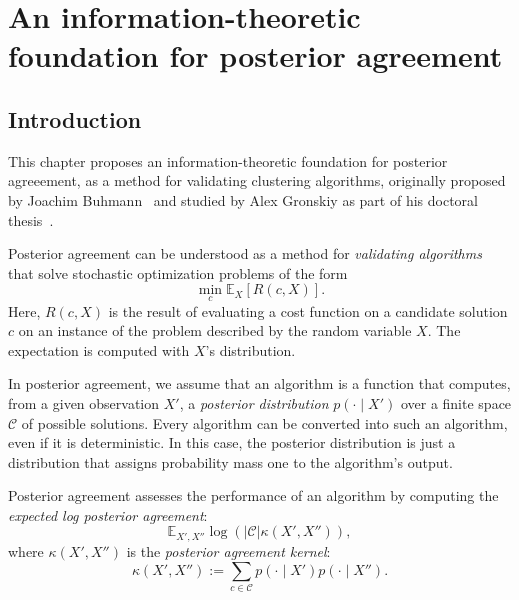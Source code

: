 \chapter{An information-theoretic foundation for posterior agreement}

\newtheorem{objective}{Objective}

%
%
%

\section{Introduction}

This chapter proposes an information-theoretic foundation for posterior agreeement, as a method for validating clustering algorithms, originally proposed by Joachim Buhmann~\cite{buhmann2010information} and studied by Alex Gronskiy as part of his doctoral thesis~\cite{gronskiy2018statistical}.
 
Posterior agreement can be understood as a method for \emph{validating algorithms} that solve stochastic optimization problems of the form
%
$$\min_{c} \mathbb{E}_X\left[R(c, X)\right].$$
% 
Here, $R(c, X)$ is the result of evaluating a cost function on a candidate solution $c$ on an instance of the problem described by the random variable $X$. The expectation is computed with $X$'s distribution.

In posterior agreement, we assume that an algorithm is a function that computes, from a given observation $X'$, a \emph{posterior distribution} $p(\cdot \mid X')$ over a finite space $\mathcal{C}$ of possible solutions. Every algorithm can be converted into such an algorithm, even if it is deterministic. In this case, the posterior distribution is just a distribution that assigns probability mass one to the algorithm's output.

Posterior agreement assesses the performance of an algorithm by computing the \emph{expected log posterior agreement}:
%
\begin{equation}
\mathbb{E}_{X', X''} \log \left(\left|\mathcal{C}\right|\kappa\left(X', X''\right)\right),
\label{eq:overview_exp_log_post_agr}
\end{equation}
%
where $\kappa\left(X', X''\right)$ is the \emph{posterior agreement kernel}:
%
$$\kappa\left(X', X''\right) := \sum_{c \in \mathcal{C}} p(\cdot \mid X')p(\cdot \mid X'').$$

